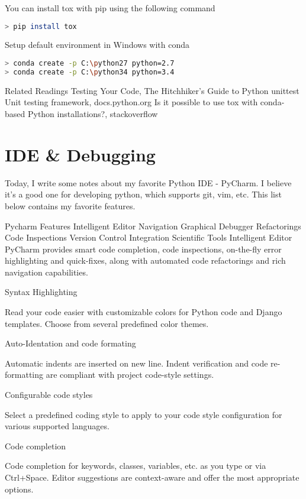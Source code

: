 You can install tox with pip using the following command

\begin{lstlisting}[language=bash]
> pip install tox
\end{lstlisting}

Setup default environment in Windows with conda

\begin{lstlisting}[language=bash]
> conda create -p C:\python27 python=2.7
> conda create -p C:\python34 python=3.4
\end{lstlisting}

Related Readings
Testing Your Code, The Hitchhiker's Guide to Python
unittest  Unit testing framework, docs.python.org
Is it possible to use tox with conda-based Python installations?, stackoverflow

\section{IDE & Debugging}

Today, I write some notes about my favorite Python IDE - PyCharm. I believe it's a good one for developing python, which supports git, vim, etc. This list below contains my favorite features.

Pycharm Features
Intelligent Editor
Navigation
Graphical Debugger
Refactorings
Code Inspections
Version Control Integration
Scientific Tools
Intelligent Editor
PyCharm provides smart code completion, code inspections, on-the-fly error highlighting and quick-fixes, along with automated code refactorings and rich navigation capabilities.

Syntax Highlighting

Read your code easier with customizable colors for Python code and Django templates. Choose from several predefined color themes.

Auto-Identation and code formating

Automatic indents are inserted on new line. Indent verification and code re-formatting are compliant with project code-style settings.

Configurable code styles

Select a predefined coding style to apply to your code style configuration for various supported languages.

Code completion

Code completion for keywords, classes, variables, etc. as you type or via Ctrl+Space. Editor suggestions are context-aware and offer the most appropriate options.

